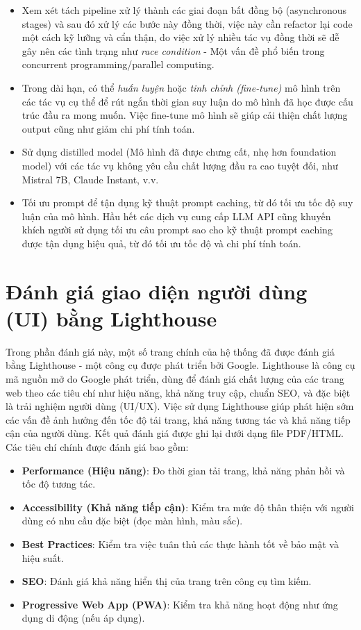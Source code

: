 \begin{itemize}
    \item Xem xét tách pipeline xử lý thành các giai đoạn bất đồng bộ (asynchronous stages) và sau đó xử lý các bước này đồng thời, việc này cần refactor lại code một cách kỹ lưỡng và cẩn thận, do việc xử lý nhiều tác vụ đồng thời sẽ dễ gây nên các tình trạng như \emph{race condition} - Một vấn đề phổ biến trong concurrent programming/parallel computing.

    \item Trong dài hạn, có thể \emph{huấn luyện} hoặc \emph{tinh chỉnh (fine-tune)} mô hình trên các tác vụ cụ thể để rút ngắn thời gian suy luận do mô hình đã học được cấu trúc đầu ra mong muốn. Việc fine-tune mô hình sẽ giúp cải thiện chất lượng output cũng như giảm chi phí tính toán.

    \item Sử dụng distilled model (Mô hình đã được chưng cất, nhẹ hơn foundation model) với các tác vụ không yêu cầu chất lượng đầu ra cao tuyệt đối, như Mistral 7B, Claude Instant, v.v.

    \item Tối ưu prompt để tận dụng kỹ thuật prompt caching, từ đó tối ưu tốc độ suy luận của mô hình. Hầu hết các dịch vụ cung cấp LLM API cũng khuyến khích người sử dụng tối ưu câu prompt sao cho kỹ thuật prompt caching được tận dụng hiệu quả, từ đó tối ưu tốc độ và chi phí tính toán\cite{openaiPromptCaching}.
\end{itemize}

\section{Đánh giá giao diện người dùng (UI) bằng Lighthouse}

Trong phần đánh giá này, một số trang chính của hệ thống đã được đánh giá bằng Lighthouse - một công cụ được phát triển bởi Google.  Lighthouse là công cụ mã nguồn mở do Google phát triển, dùng để đánh giá chất lượng của các trang web theo các tiêu chí như hiệu năng, khả năng truy cập, chuẩn SEO, và đặc biệt là trải nghiệm người dùng (UI/UX). Việc sử dụng Lighthouse giúp phát hiện sớm các vấn đề ảnh hưởng đến tốc độ tải trang, khả năng tương tác và khả năng tiếp cận của người dùng. Kết quả đánh giá được ghi lại dưới dạng file PDF/HTML. Các tiêu chí chính được đánh giá bao gồm:

\begin{itemize}
    \item \textbf{Performance (Hiệu năng)}: Đo thời gian tải trang, khả năng phản hồi và tốc độ tương tác.
    \item \textbf{Accessibility (Khả năng tiếp cận)}: Kiểm tra mức độ thân thiện với người dùng có nhu cầu đặc biệt (đọc màn hình, màu sắc).
    \item \textbf{Best Practices}: Kiểm tra việc tuân thủ các thực hành tốt về bảo mật và hiệu suất.
    \item \textbf{SEO}: Đánh giá khả năng hiển thị của trang trên công cụ tìm kiếm.
    \item \textbf{Progressive Web App (PWA)}: Kiểm tra khả năng hoạt động như ứng dụng di động (nếu áp dụng).
\end{itemize}

